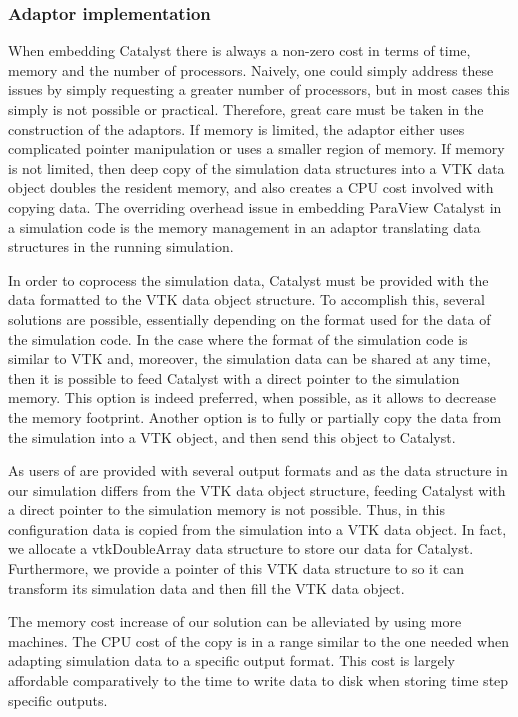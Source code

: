 \subsubsection{Adaptor implementation}
When embedding Catalyst there is always a non-zero cost in terms of time, memory and the number of processors. Naively, one could simply
address these issues by simply requesting a greater number of processors, but in most cases this simply is
not possible or practical. Therefore, great care must be taken in the construction of the adaptors.
If memory is limited, the adaptor either uses complicated pointer manipulation or uses a smaller region
of memory. If memory is not limited, then deep copy of the simulation data structures into a VTK
data object doubles the resident memory, and also creates a CPU cost involved with copying data.
The overriding overhead issue in embedding ParaView Catalyst in a simulation code is the memory
management in an adaptor translating data structures in the running simulation.

In order to coprocess the simulation data, Catalyst must be provided with the
data formatted to the VTK data object structure. To accomplish this, several
solutions are possible, essentially depending on the format used for the data
of the simulation code. In the case where the format of the simulation code is
similar to VTK  and, moreover, the simulation data can be shared at any time,
then it is possible to feed Catalyst with a direct pointer to the simulation
memory. This option is indeed preferred, when possible, as it allows to decrease the memory footprint.
Another option is to fully or partially copy the data from the
simulation into a VTK object, and then send this object to Catalyst.

As users of \CS are provided with several output formats and as the data
structure in our simulation differs from the VTK data object structure, feeding
Catalyst with a direct pointer to the simulation memory is not possible. Thus, in this configuration
data is copied from the simulation into a VTK data object. In fact, we
 allocate a vtkDoubleArray data structure to store our data for Catalyst. Furthermore, we
provide a pointer of this VTK data structure to \CS so it can transform
its simulation data and then fill the VTK data object.

The memory cost increase of our solution can be alleviated by using more
machines. The CPU cost of the copy is in a range similar to the one needed when
adapting simulation data to a specific output format. This cost is largely
affordable comparatively to the time to write data to disk when storing time
step specific outputs. 

